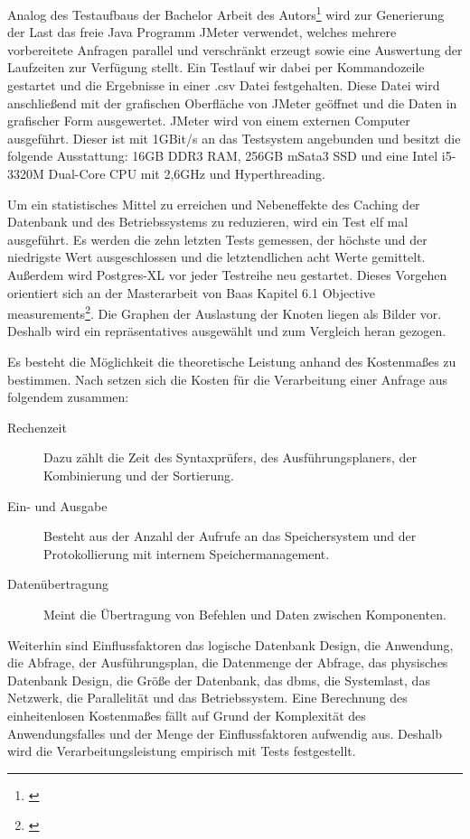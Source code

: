 Analog des Testaufbaus der Bachelor Arbeit des Autors\footnote{\cite{ba:kurt}} wird zur Generierung der Last das freie Java Programm JMeter verwendet, welches mehrere vorbereitete Anfragen parallel und verschränkt erzeugt sowie eine Auswertung der Laufzeiten zur Verfügung stellt.
Ein Testlauf wir dabei per Kommandozeile gestartet und die Ergebnisse in einer .csv Datei festgehalten.
Diese Datei wird anschließend mit der grafischen Oberfläche von JMeter geöffnet und die Daten in grafischer Form ausgewertet.
JMeter wird von einem externen Computer ausgeführt.
Dieser ist mit 1GBit/s an das Testsystem angebunden und besitzt die folgende Ausstattung:
16GB DDR3 RAM, 256GB mSata3 SSD und eine Intel i5-3320M Dual-Core CPU mit 2,6GHz und Hyperthreading.

Um ein statistisches Mittel zu erreichen und Nebeneffekte des Caching der Datenbank und des Betriebssystems zu reduzieren, wird ein Test elf mal ausgeführt.
Es werden die zehn letzten Tests gemessen, der höchste und der niedrigste Wert ausgeschlossen und die letztendlichen acht Werte gemittelt.
Außerdem wird Postgres-XL vor jeder Testreihe neu gestartet.
Dieses Vorgehen orientiert sich an der Masterarbeit von Baas Kapitel 6.1 Objective measurements\footnote{\cite[S.51]{ma:neo4j}}.
Die Graphen der Auslastung der Knoten liegen als Bilder vor.
Deshalb wird ein repräsentatives ausgewählt und zum Vergleich heran gezogen.

Es besteht die Möglichkeit die theoretische Leistung anhand des Kostenmaßes zu bestimmen.
Nach \cite[S.300 f.]{book:kudrass} setzen sich die Kosten für die Verarbeitung einer Anfrage aus folgendem zusammen:
\begin{description}
\item[Rechenzeit] Dazu zählt die Zeit des Syntaxprüfers, des Ausführungsplaners, der Kombinierung und der Sortierung.
\item[Ein- und Ausgabe] Besteht aus der Anzahl der Aufrufe an das Speichersystem und der Protokollierung mit internem Speichermanagement.
\item[Datenübertragung] Meint die Übertragung von Befehlen und Daten zwischen Komponenten.
\end{description}
Weiterhin sind Einflussfaktoren das  logische Datenbank Design, die Anwendung, die Abfrage, der Ausführungsplan, die Datenmenge der Abfrage, das physisches Datenbank Design, die Größe der Datenbank, das \Gls{dbms}, die Systemlast, das Netzwerk, die  Parallelität und das Betriebssystem.
Eine Berechnung des einheitenlosen Kostenmaßes fällt auf Grund der Komplexität des Anwendungsfalles und der Menge der Einflussfaktoren aufwendig aus.
Deshalb wird die Verarbeitungsleistung empirisch mit Tests festgestellt.

